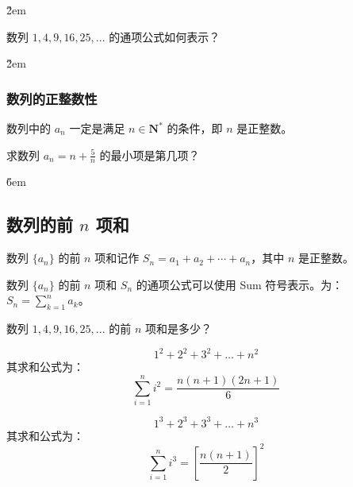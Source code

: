 \v{2em}

\begin{problem}
数列 $1,4,9,16,25,...$ 的通项公式如何表示？
\end{problem}

\v{2em}

\subsubsection{数列的正整数性}

\begin{theorem}
    数列中的 $a_n$ 一定是满足 $n \in \mathbf{N}^*$ 的条件，即 $n$ 是正整数。
\end{theorem}

\begin{example}
    求数列 $a_n = n + \frac{5}{n}$ 的最小项是第几项？
\end{example}

\v{6em}

\subsection{数列的前 $n$ 项和}

\begin{definition}
    数列 $\{a_n\}$ 的前 $n$ 项和记作 $S_n = a_1 + a_2 + \cdots + a_n$，其中 $n$ 是正整数。
\end{definition}

\begin{theorem}
    数列 $\{a_n\}$ 的前 $n$ 项和 $S_n$ 的通项公式可以使用 Sum 符号表示。为：$S_n = \sum_{k=1}^{n} a_k$。
\end{theorem}

\begin{problem}
数列 $1,4,9,16,25,...$ 的前 $n$ 项和是多少？
\end{problem}

\begin{theorem}[平方和公式和立方和公式]
    $$ 1^2 + 2^2 + 3^2 + \dots + n^2 $$
    其求和公式为：
    $$ \sum_{i=1}^{n} i^2 = \frac{n(n+1)(2n+1)}{6} $$

    $$ 1^3 + 2^3 + 3^3 + \dots + n^3 $$
    其求和公式为：
    $$ \sum_{i=1}^{n} i^3 = \left[ \frac{n(n+1)}{2} \right]^2 $$
\end{theorem}

